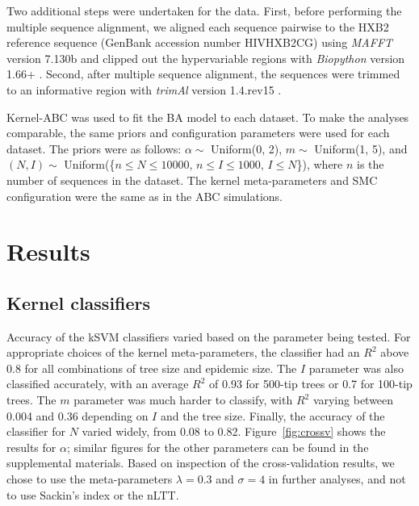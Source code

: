 \documentclass[12pt]{article}\usepackage[]{graphicx}\usepackage[]{color}
\newcommand{\software}[1]{\textit{#1}}
\newcommand{\sett}[1]{\{#1\}}
\begin{document}
Two additional steps were undertaken for the
\textcite{novitsky2013phylogenetic, novitsky2014impact} data. First, before
performing the multiple sequence alignment, we aligned each
sequence pairwise to the HXB2 reference sequence (GenBank accession number
HIVHXB2CG) using \software{MAFFT} version 7.130b \autocite{katoh2013mafft} and
clipped out the hypervariable regions with \software{Biopython}
version 1.66+ \autocite{cock2009biopython}. Second, after multiple sequence
alignment, the sequences were trimmed to an informative region with
\software{trimAl} version 1.4.rev15 \autocite{capella2009trimal}.

Kernel-ABC was used to fit the \gls{BA} model to each dataset. To make the
analyses comparable, the same priors and configuration parameters were used for
each dataset. The priors were as follows: $\alpha \sim$ Uniform(0, 2), $m \sim$
Uniform(1, 5), and $(N, I) \sim$ Uniform(\sett{$n \leq N \leq 10000$, $n \leq I
\leq 1000$, $I \leq N$}), where $n$ is the number of sequences in the dataset.
The kernel meta-parameters and SMC configuration were the same as in the
\gls{ABC} simulations.

\section*{Results}

\subsection*{Kernel classifiers}



Accuracy of the \gls{kSVM} classifiers varied based on the parameter being
tested. For appropriate choices of the kernel meta-parameters, the classifier
had an $R^2$ above 
    0.8 
for all combinations of tree size and epidemic size. The $I$ parameter was also
classified accurately, with an average $R^2$ of 
    0.93 
for 500-tip trees or 
    0.7 
for 100-tip trees. The $m$ parameter was much harder to classify, with $R^2$
varying between 
    0.004
and
    0.36
depending on $I$ and the tree size. Finally, the accuracy of the classifier for
$N$ varied widely, from 
    0.08
to
    0.82.
Figure~\ref{fig:crossv} shows the results for $\alpha$; similar figures for the
other parameters can be found in the supplemental materials. Based on
inspection of the cross-validation results, we chose to use the meta-parameters
$\lambda = 0.3$ and $\sigma = 4$ in further analyses, and not to use Sackin's
index or the \gls{nLTT}.
\end{document}
